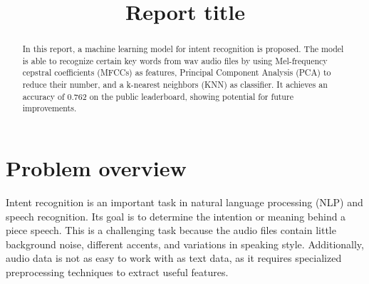 \documentclass[conference]{IEEEtran}
\begin{document}
\title{Report title}

\author{
}

\maketitle

\begin{abstract}
    In this report, a machine learning model for intent recognition is proposed.
    The model is able to recognize certain key words from wav audio files by using Mel-frequency cepstral coefficients (MFCCs) as features, Principal Component Analysis (PCA) to reduce their number, and a k-nearest neighbors (KNN) as classifier.
    It achieves an accuracy of 0.762 on the public leaderboard, showing potential for future improvements.
\end{abstract}


%         
%         

\section{Problem overview}
Intent recognition is an important task in natural language processing (NLP) and speech recognition.
Its goal is to determine the intention or meaning behind a piece speech.
This is a challenging task because the audio files contain little background noise, different accents, and variations in speaking style.
Additionally, audio data is not as easy to work with as text data, as it requires specialized preprocessing techniques to extract useful features.
\end{document}
